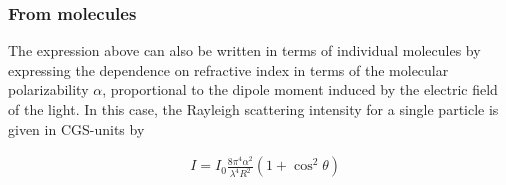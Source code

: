 \subsubsection{From molecules}

The expression above can also be written in terms of individual molecules by expressing the dependence on refractive index in terms of the molecular polarizability $\alpha$, proportional to the dipole moment induced by the electric field of the light. In this case, the Rayleigh scattering intensity for a single particle is given in CGS-units by

\begin{align*}
&I=I_0\frac{8\pi^4\alpha^2}{\lambda^4R^2}(1+\cos^2{\theta})
\end{align*}